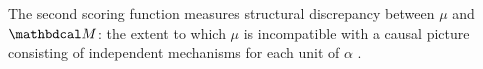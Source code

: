\documentclass{article}
\newcommand\vjoe[1]{{\color{joecolor}\textbf{$\boldsymbol\{$Joe: }#1 \textbf{$\boldsymbol\}$}}}
\newcommand\voli[1]{{\color{olicolor}\textbf{$\boldsymbol\{$Oli: }#1 \textbf{$\boldsymbol\}$}}}
\begin{document}
The second scoring function measures
structural discrepancy between $\mu$ and $\dg M$:
the extent to which
$\mu$ 
is incompatible with %
a causal picture consisting of independent mechanisms 
for each unit of $\alpha$
\unskip.
\end{document}
